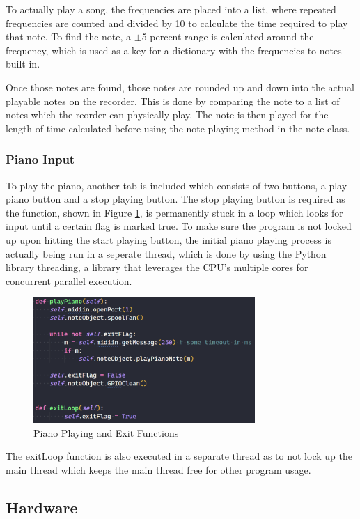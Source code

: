 \documentclass[UTF8, 12pt]{article}
\begin{document}
    To actually play a song, the frequencies are placed into a list, where repeated frequencies are counted and divided by 10 to calculate the time required to play that note. To find the note, a $\pm$5 percent range is calculated around the frequency, which is used as a key for a dictionary with the frequencies to notes built in.

    Once those notes are found, those notes are rounded up and down into the actual playable notes on the recorder. This is done by comparing the note to a list of notes which the reorder can physically play. The note is then played for the length of time calculated before using the note playing method in the note class.
    
\subsubsection{Piano Input}
    To play the piano, another tab is included which consists of two buttons, a play piano button and a stop playing button. The stop playing button is required as the function, shown in Figure \ref{piano_play}, is permanently stuck in a loop which looks for input until a certain flag is marked true. To make sure the program is not locked up upon hitting the start playing button, the initial piano playing process is actually being run in a seperate thread, which is done by using the Python library threading, a library that leverages the CPU's multiple cores for concurrent parallel execution.
    \begin{figure}[h]
        \centering
        \includegraphics[width=0.75\textwidth]{piano_play.png}
        \caption{Piano Playing and Exit Functions}
        \label{piano_play}
    \end{figure}
    The exitLoop function is also executed in a separate thread as to not lock up the main thread which keeps the main thread free for other program usage.

\subsection{Hardware}
\end{document}

